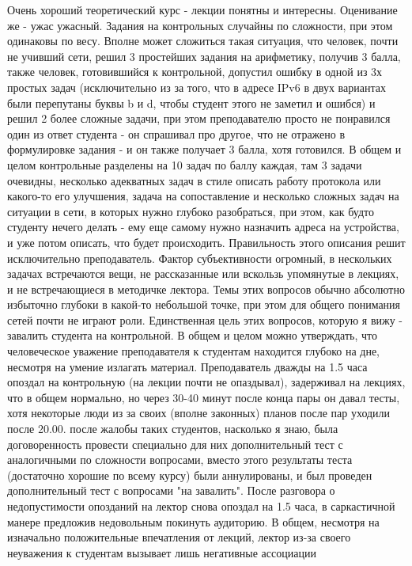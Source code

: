 \begin{commentbox}
                Очень хороший теоретический курс - лекции понятны и интересны. Оценивание же - ужас ужасный. Задания на контрольных случайны по сложности, при этом одинаковы по весу. Вполне может сложиться такая ситуация, что человек, почти не учивший сети, решил 3 простейших задания на арифметику, получив 3 балла, также человек, готовившийся к контрольной, допустил ошибку в одной из 3х простых задач (исключительно из за того, что в адресе IPv6 в двух вариантах были перепутаны буквы b и d, чтобы студент этого не заметил и ошибся) и решил 2 более сложные задачи, при этом преподавателю просто не понравился один из ответ студента - он спрашивал про другое, что не отражено в формулировке задания - и он также получает 3 балла, хотя готовился. В общем и целом контрольные разделены на 10 задач по баллу каждая, там 3 задачи очевидны, несколько адекватных задач в стиле описать работу протокола или какого-то его улучшения, задача на сопоставление и несколько сложных задач на ситуации в сети, в которых нужно глубоко разобраться, при этом, как будто студенту нечего делать - ему еще самому нужно назначить адреса на устройства, и уже потом описать, что будет происходить. Правильность этого описания решит исключительно преподаватель. Фактор субъективности огромный, в нескольких задачах встречаются вещи, не рассказанные или вскользь упомянутые в лекциях, и не встречающиеся в методичке лектора. Темы этих вопросов обычно абсолютно избыточно глубоки в какой-то небольшой точке, при этом для общего понимания сетей почти не играют роли. Единственная цель этих вопросов, которую я вижу - завалить студента на контрольной. В общем и целом можно утверждать, что человеческое уважение преподавателя к студентам находится глубоко на дне, несмотря на умение излагать материал. Преподаватель дважды на 1.5 часа опоздал на контрольную (на лекции почти не опаздывал), задерживал на лекциях, что в общем нормально, но через 30-40 минут после конца пары он давал тесты, хотя некоторые люди из за своих (вполне законных) планов после пар уходили после 20.00. после жалобы таких студентов, насколько я знаю, была договоренность провести специально для них дополнительный тест с аналогичными по сложности вопросами, вместо этого результаты теста (достаточно хорошие по всему курсу) были аннулированы, и был проведен дополнительный тест с вопросами "на завалить". После разговора о недопустимости опозданий на лектор снова опоздал на 1.5 часа, в саркастичной манере предложив недовольным покинуть аудиторию. В общем, несмотря на изначально положительные впечатления от лекций, лектор из-за своего неуважения к студентам вызывает лишь негативные ассоциации  
            \end{commentbox} 
        
